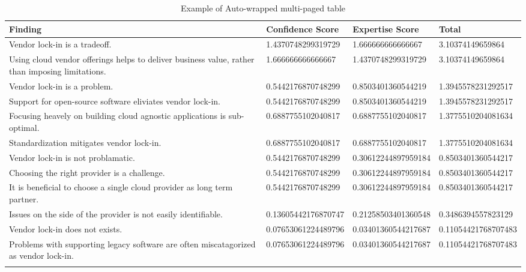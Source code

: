 
\renewcommand\arraystretch{1.5}%
\begin{longtable}{|p{10cm}|p{2cm}|p{2cm}|}
\hline
\textbf{Finding}  & \textbf{Confidence Score} & \textbf{Expertise Score} & \textbf{Total} \\ \hline
\endhead
Vendor lock-in is a tradeoff. & 1.4370748299319729 & 1.666666666666667 & 3.10374149659864 \\ \hline
Using cloud vendor offerings helps to deliver business value, rather than imposing limitations. & 1.666666666666667 & 1.4370748299319729 & 3.10374149659864 \\ \hline
Vendor lock-in is a problem. & 0.5442176870748299 & 0.8503401360544219 & 1.3945578231292517 \\ \hline
Support for open-source software eliviates vendor lock-in. & 0.5442176870748299 & 0.8503401360544219 & 1.3945578231292517 \\ \hline
Focusing heavely on building cloud agnostic applications is sub-optimal. & 0.6887755102040817 & 0.6887755102040817 & 1.3775510204081634 \\ \hline
Standardization mitigates vendor lock-in. & 0.6887755102040817 & 0.6887755102040817 & 1.3775510204081634 \\ \hline
Vendor lock-in is not problamatic. & 0.5442176870748299 & 0.30612244897959184 & 0.8503401360544217 \\ \hline
Choosing the right provider is a challenge. & 0.5442176870748299 & 0.30612244897959184 & 0.8503401360544217 \\ \hline
It is beneficial to choose a single cloud provider as long term partner. & 0.5442176870748299 & 0.30612244897959184 & 0.8503401360544217 \\ \hline
Issues on the side of the provider is not easily identifiable. & 0.13605442176870747 & 0.21258503401360548 & 0.3486394557823129 \\ \hline
Vendor lock-in does not exists. & 0.07653061224489796 & 0.03401360544217687 & 0.11054421768707483 \\ \hline
Problems with supporting legacy software are often miscatagorized as vendor lock-in. & 0.07653061224489796 & 0.03401360544217687 & 0.11054421768707483 \\ \hline
\caption{Example of Auto-wrapped multi-paged table}
\label{tab:table1}
\end{longtable}
